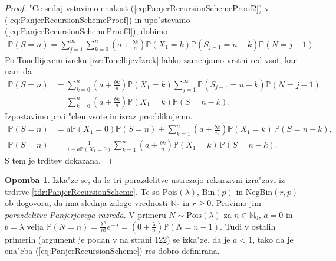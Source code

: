\documentclass[12pt, a4paper, reqno]{amsart}
\theoremstyle{definition}
\newtheorem{opomba}[definicija]{Opomba}
\theoremstyle{plain}
\newcommand{\N}{\mathbb{N}}
\newcommand{\Prob}{\mathbb{P}}
\newcommand{\1}{\mathds{1}}
\newcommand{\Pois}[1]{\text{Pois}(#1)}
\newcommand*{\refPriloga}[1]{%
  \begingroup
    \hypersetup{
      linkcolor=red,
      linkbordercolor=red,
    }%
    \ref{#1}%
  \endgroup
}
\begin{document}
\begin{proof}
        \pagebreak
        \noindent
        "Ce sedaj vstavimo enakost (\ref{eq:PanjerRecursionSchemeProof2}) v (\ref{eq:PanjerRecursionSchemeProof}) 
        in upo"stevamo (\ref{eq:PanjerRecursionSchemeProof3}), dobimo
        \begin{align*}
            \Prob(S = n)
                = \sum_{j = 1}^\infty\sum_{k = 0}^n \left(a + \frac{bk}{n}\right)\Prob(X_1 = k)\Prob(S_{j - 1} = n - k)\Prob(N = j - 1).
        \end{align*}
        Po Tonellijevem izreku \refPriloga{izr:TonellijevIzrek} lahko zamenjamo vrstni red vsot, kar nam da
        \begin{align*}
            \Prob(S = n) 
                &= \sum_{k = 0}^n\left(a + \frac{bk}{n}\right)\Prob(X_1 = k)\sum_{j = 1}^\infty\Prob(S_{j - 1} = n - k)\Prob(N = j - 1)\\
                &= \sum_{k = 0}^n\left(a + \frac{bk}{n}\right)\Prob(X_1 = k)\Prob(S = n - k).
        \end{align*}
        Izpostavimo prvi "clen vsote in izraz preoblikujemo.
        \begin{align*}
            \Prob(S = n) 
                &= a\Prob(X_1 = 0)\Prob(S = n) + \sum_{k = 1}^n\left(a + \frac{bk}{n}\right)\Prob(X_1 = k)\,\Prob(S = n - k), \\
            \Prob(S = n)
                &= \frac{1}{1 - a\Prob(X_1 = 0)}\sum_{k = 1}^n\left(a + \frac{bk}{n}\right)\Prob(X_1 = k)\,\Prob(S = n - k).
        \end{align*}
        S tem je trditev dokazana.
    \end{proof}

    \begin{opomba}
        Izka"ze se, da le tri porazdelitve 
        ustrezajo rekurzivni izra"zavi iz trditve \ref{tdr:PanjerRecursionScheme}. Te so $\Pois{\lambda}$, $\text{Bin}(p)$ in
        $\text{NegBin}(r, p)$ ob dogovoru, da ima slednja zalogo vrednosti $\N_0$ in $r\geq0$. Pravimo jim \textit{porazdelitve Panjerjevega razreda}. 
        V primeru $N\sim\Pois{\lambda}$ za $n\in\N_0$, $a = 0$ in $b = \lambda$ velja $\Prob\left(N = n\right) = \frac{\lambda^n}{n!}e^{-\lambda} = 
        \left(0 + \frac{\lambda}{n}\right)\Prob\left(N = n - 1\right)$. 
        Tudi v ostalih primerih (argument je podan v \cite{4} na strani 122) se izka"ze, da je $a < 1$, tako da je 
        ena"cba (\ref{eq:PanjerRecursionScheme}) res dobro definirana.
        \label{op:PanjerRazsiritev}
    \end{opomba}
\end{document}
